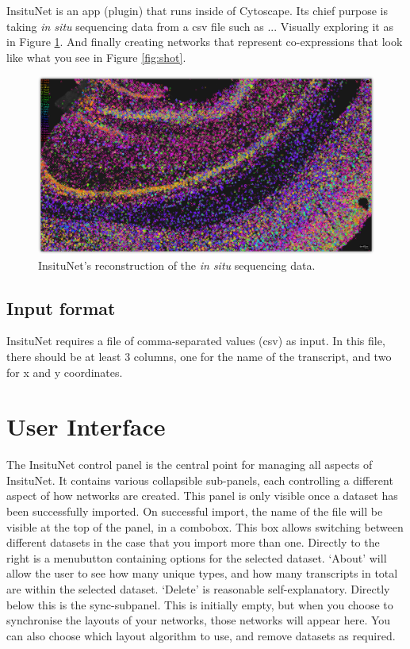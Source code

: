\documentclass[a4paper,12pt]{article}
\begin{document}
InsituNet is an app (plugin) that runs inside of Cytoscape. Its chief purpose is taking \emph{in situ} sequencing data from a csv file such as ... Visually exploring it as in Figure \ref{fig:recon}. And finally creating networks that represent co-expressions that look like what you see in Figure \ref{fig:shot}.
\begin{figure}[h]
	\caption{InsituNet's reconstruction of the \emph{in situ} sequencing data.}\label{fig:recon}
	\centering
	\includegraphics[width=\textwidth]{reconstruction-shadow}
\end{figure}

\subsection{Input format}
InsituNet requires a file of comma-separated values (csv) as input. In this file, there should be at least 3 columns, one for the name of the transcript, and two for x and y coordinates. 

\section{User Interface}

The InsituNet control panel is the central point for managing all aspects of InsituNet. It contains various collapsible sub-panels, each controlling a different aspect of how networks are created. This panel is only visible once a dataset has been successfully imported. On successful import, the name of the file will be visible at the top of the panel, in a combobox. This box allows switching between different datasets in the case that you import more than one. Directly to the right is a menubutton containing options for the selected dataset. `About' will allow the user to see how many unique types, and how many transcripts in total are within the selected dataset. `Delete' is reasonable self-explanatory. Directly below this is the sync-subpanel. This is initially empty, but when you choose to synchronise the layouts of your networks, those networks will appear here. You can also choose which layout algorithm to use, and remove datasets as required. 
\end{document}
